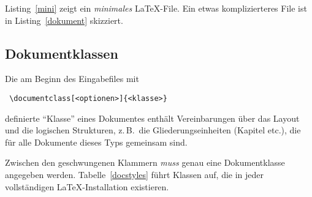 Listing~\ref{mini} zeigt ein \emph{minimales} \LaTeX-File. Ein etwas 
komplizierteres File ist in Listing~\ref{dokument} skizziert.
 



\subsection{Dokumentklassen}\label{docsty}
 
Die am Beginn des Eingabefiles  mit
\begin{lstlisting}
 \documentclass[<optionen>]{<klasse>}
\end{lstlisting}
definierte "`Klasse"' eines Dokumentes enthält Vereinbarungen über das Layout 
und die logischen Strukturen, z.\,B.\ die Gliederungseinheiten (Kapitel etc.\@), 
die für alle Dokumente dieses Typs gemeinsam sind.

Zwischen den geschwungenen Klammern \emph{muss} genau eine Dokumentklasse
angegeben werden.  Tabelle~\vref{docstyles} führt 
Klassen auf, die in jeder vollständigen \LaTeX-Installation existieren. 

